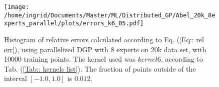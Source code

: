 \documentclass[twoside,english]{uiofysmaster}
\begin{document}
\begin{figure}
\centering
\texttt{[image: /home/ingrid/Documents/Master/ML/Distributed\_GP/Abel\_20k\_8experts\_parallel/plots/errors\_k6\_05.pdf]}
\caption{ Histogram of relative errors calculated according to Eq. (\ref{Eq:: rel err}), using parallelized DGP with 8 experts on 20k data set, with 10000 training points. The kernel used was $kernel6$, according to Tab. (\ref{Tab:: kernels list}). The fraction of points outside of the interval $[-1.0,1.0]$ is $0.012$.}
\label{Fig:: DGP parallel 8 exp 4 nodes kernel 6 error histogram}
\end{figure}






\end{document}
